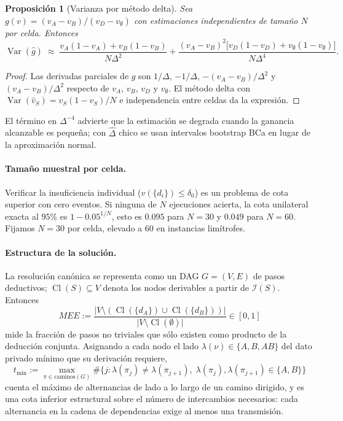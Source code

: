 \documentclass[11pt,a4paper]{article}
\theoremstyle{definition}
\theoremstyle{plain}
\newtheorem{proposicion}[definicion]{Proposición}
\theoremstyle{remark}
\DeclareMathOperator{\Var}{Var}
\DeclareMathOperator{\Cl}{Cl}
\newcommand{\Info}{\mathcal{I}}
\begin{document}
\begin{proposicion}[Varianza por método delta]\label{prop:delta}
Sea $g(v)=(v_A-v_B)/(v_D-v_\emptyset)$ con estimaciones independientes de tamaño
$N$ por celda. Entonces
\[
  \Var(\hat g)\;\approx\;
  \frac{v_A(1-v_A)+v_B(1-v_B)}{N\Delta^{2}}
  +\frac{(v_A-v_B)^{2}\big[v_D(1-v_D)+v_\emptyset(1-v_\emptyset)\big]}{N\Delta^{4}}.
\]
\end{proposicion}

\begin{proof}
Las derivadas parciales de $g$ son $1/\Delta$, $-1/\Delta$,
$-(v_A-v_B)/\Delta^{2}$ y $(v_A-v_B)/\Delta^{2}$ respecto de $v_A$, $v_B$, $v_D$ y
$v_\emptyset$. El método delta con $\Var(\hat v_S)=v_S(1-v_S)/N$ e independencia
entre celdas da la expresión.
\end{proof}

El término en $\Delta^{-4}$ advierte que la estimación se degrada cuando la
ganancia alcanzable es pequeña; con $\hat\Delta$ chico se usan intervalos
bootstrap BCa en lugar de la aproximación normal.

\paragraph{Tamaño muestral por celda.} Verificar la insuficiencia individual
($v(\{d_i\})\le\delta_0$) es un problema de cota superior con cero eventos. Si
ninguna de $N$ ejecuciones acierta, la cota unilateral exacta al $95\%$ es
$1-0.05^{1/N}$, esto es $0.095$ para $N=30$ y $0.049$ para $N=60$. Fijamos $N=30$
por celda, elevado a $60$ en instancias limítrofes.

\paragraph{Estructura de la solución.}
La resolución canónica se representa como un DAG $G=(V,E)$ de pasos deductivos;
$\Cl(S)\subseteq V$ denota los nodos derivables a partir de $\Info(S)$. Entonces
\[
  MEE:=\frac{\big|V\setminus(\Cl(\{d_A\})\cup\Cl(\{d_B\}))\big|}
            {\big|V\setminus\Cl(\emptyset)\big|}\in[0,1]
\]
mide la fracción de pasos no triviales que sólo existen como producto de la
deducción conjunta. Asignando a cada nodo el lado $\lambda(\nu)\in\{A,B,AB\}$ del
dato privado mínimo que su derivación requiere,
\[
  t_{\min}:=\max_{\pi\in\mathrm{caminos}(G)}
  \#\big\{j:\lambda(\pi_j)\neq\lambda(\pi_{j+1}),\;
  \lambda(\pi_j),\lambda(\pi_{j+1})\in\{A,B\}\big\}
\]
cuenta el máximo de alternancias de lado a lo largo de un camino dirigido, y es
una cota inferior estructural sobre el número de intercambios necesarios: cada
alternancia en la cadena de dependencias exige al menos una transmisión.
\end{document}

